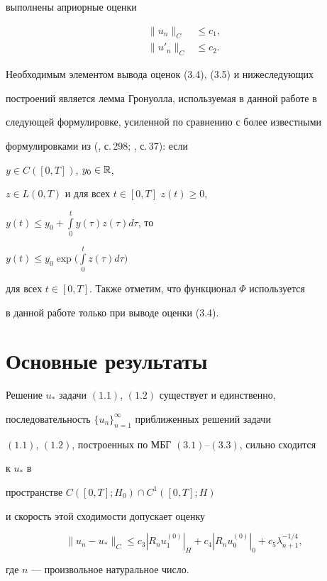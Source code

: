 выполнены априорные оценки 


\begin{align} 


\|u_n\|_C &\le c_1, \\ 


\|u'_n\|_C &\le c_2. 


\end{align} 


 


\begin{notenonum} 


Необходимым элементом вывода оценок (3.4), (3.5) и нижеследующих 


построений является лемма Гронуолла, используемая в данной работе в 


следующей формулировке, усиленной по сравнению с более известными 


формулировками из (\cite{16}, с.\,298; \cite{17}, с.\,37): если 


$y\in C([0,T])$, $y_0\in\Bbb R$, 


$z\in L(0,T)$ и для всех $t\in[0,T]$\; $z(t)\ge 0$, 


$y(t)\le{}y_0+\int\limits^t_0{}y(\tau)z(\tau)d\tau$, то 


$y(t)\le y_0\exp\Big(\int\limits^t_0z(\tau)d\tau\Big)$ 


для всех $t\in[0,T]$. Также отметим, что функционал $\Phi$ используется 


в данной работе только при выводе оценки (3.4). 


\end{notenonum} 


 


\section{Основные результаты} 


 


\begin{thmnonum} 


Решение $u_*$ задачи $(1.1)$, $(1.2)$ существует и единственно, 


последовательность $\{u_n\}^\infty_{n=1}$ приближенных решений задачи 


$(1.1)$, $(1.2)$, построенных по МБГ $(3.1)$--$(3.3)$, сильно сходится 


к $u_*$ в 


пространстве $C([0,T];H_0)\cap C^1([0,T];H)$ 


и скорость этой сходимости допускает оценку 


\begin{equation} 


\|u_n-u_*\|_C\le c_3|R_n u^{(0)}_1|_H+c_4 


|R_n u^{(0)}_0|_0+c_5\lambda^{-1/4}_{n+1},


\end{equation} 


где $n$ --- произвольное натуральное число. 


\end{thmnonum} 


